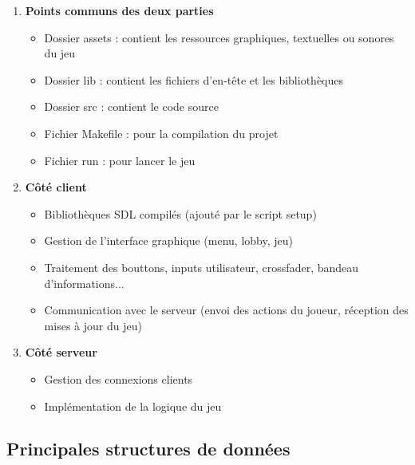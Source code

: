 \documentclass[12pt,a4paper]{article}
\begin{document}
        \begin{enumerate}
            \item \textbf{Points communs des deux parties}
                \begin{itemize}
                    \item Dossier assets : contient les ressources graphiques, textuelles ou sonores du jeu
                    \item Dossier lib : contient les fichiers d’en-tête et les bibliothèques
                    \item Dossier src : contient le code source
                    \item Fichier Makefile : pour la compilation du projet
                    \item Fichier run : pour lancer le jeu
                \end{itemize}
            \item \textbf{Côté client}
                \begin{itemize}
                    \item Bibliothèques SDL compilés (ajouté par le script setup)
                    \item Gestion de l'interface graphique (menu, lobby, jeu) 
                    \item Traitement des bouttons, inputs utilisateur, crossfader, bandeau d'informations...
                    \item Communication avec le serveur (envoi des actions du joueur, réception des mises à jour du jeu)
                \end{itemize}
            \item \textbf{Côté serveur}
                \begin{itemize}
                    \item Gestion des connexions clients
                    \item Implémentation de la logique du jeu
                \end{itemize}
        \end{enumerate}

        \subsection{Principales structures de données}
\end{document}
